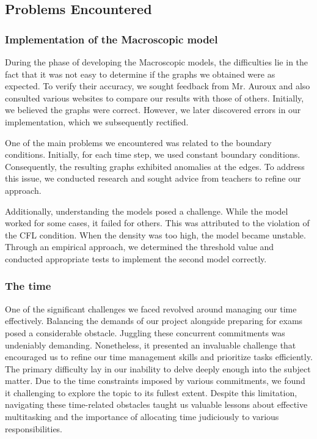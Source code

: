 \documentclass{article}
\begin{document}
	\subsection{Problems Encountered}
	\subsubsection{Implementation of the Macroscopic model}
		During the phase of developing the Macroscopic models, the difficulties lie in the fact that it was not easy to determine if the graphs we obtained were as expected. To verify their accuracy, we sought feedback from Mr. Auroux and also consulted various websites to compare our results with those of others. Initially, we believed the graphs were correct. However, we later discovered errors in our implementation, which we subsequently rectified.
		
		One of the main problems we encountered was related to the boundary conditions. Initially, for each time step, we used constant boundary conditions. Consequently, the resulting graphs exhibited anomalies at the edges. To address this issue, we conducted research and sought advice from teachers to refine our approach.
		
		Additionally, understanding the models posed a challenge. While the model worked for some cases, it failed for others. This was attributed to the violation of the CFL condition. When the density was too high, the model became unstable. Through an empirical approach, we determined the threshold value and conducted appropriate tests to implement the second model correctly.
	\subsubsection{The time}
		 One of the significant challenges we faced revolved around managing our time effectively. Balancing the demands of our project alongside preparing for exams posed a considerable obstacle. Juggling these concurrent commitments was undeniably demanding. Nonetheless, it presented an invaluable challenge that encouraged us to refine our time management skills and prioritize tasks efficiently. The primary difficulty lay in our inability to delve deeply enough into the subject matter. Due to the time constraints imposed by various commitments, we found it challenging to explore the topic to its fullest extent. Despite this limitation, navigating these time-related obstacles taught us valuable lessons about effective multitasking and the importance of allocating time judiciously to various responsibilities.
\end{document}
